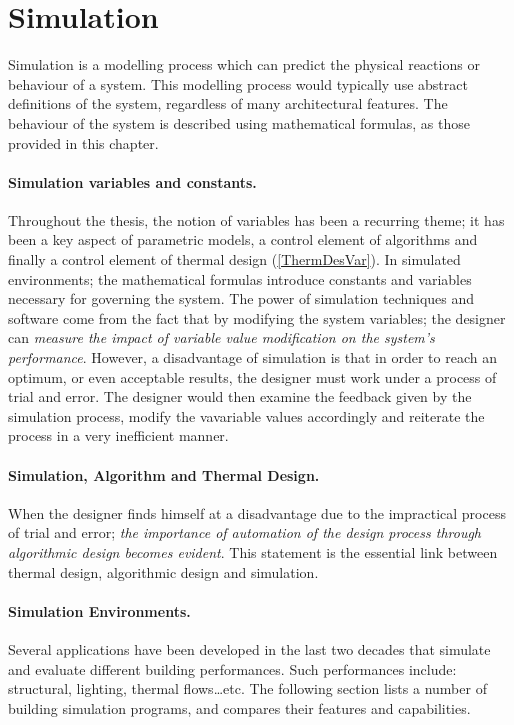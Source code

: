 \clearpage
\section{Simulation}

Simulation is a modelling process which can predict the physical reactions or behaviour of a system. This modelling process would typically use abstract definitions of the system, regardless of many architectural features. The behaviour of the system is described using mathematical formulas, as those provided in this chapter. \cite{fasoulaki08}

\paragraph{Simulation variables and constants.} Throughout the thesis, the notion of variables has been a recurring theme; it has been a key aspect of parametric models, a control element of algorithms and finally a control element of thermal design (\autoref{ThermDesVar}). In simulated environments; the mathematical formulas introduce constants and variables necessary for governing the system. The power of simulation techniques and software come from the fact that by modifying the system variables; the designer can \emph{measure the impact of variable value modification on the system's performance}. However, a disadvantage of simulation is that in order to reach an optimum, or even acceptable results, the designer must work under a process of trial and error. The designer would then examine the feedback given by the simulation process, modify the vavariable values accordingly and reiterate the process in a very inefficient manner. \cite{fasoulaki08}

\paragraph{Simulation, Algorithm and Thermal Design.} When the designer finds himself at a disadvantage due to the impractical process of trial and error; \emph{the importance of automation of the design process through algorithmic design becomes evident}. This statement is the essential link between thermal design, algorithmic design and simulation.

\paragraph{Simulation Environments.} Several applications have been developed in the last two decades that simulate and evaluate different building performances. Such performances include: structural, lighting, thermal flows\ldots etc. The following section lists a number of building simulation programs, and compares their features and capabilities.


